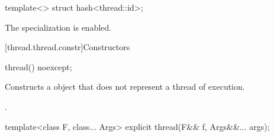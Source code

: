 %
\begin{itemdecl}
template<> struct hash<thread::id>;
\end{itemdecl}

\begin{itemdescr}
\pnum The specialization is enabled.
\end{itemdescr}

[thread.thread.constr]{Constructors}

%
\begin{itemdecl}
thread() noexcept;
\end{itemdecl}

\begin{itemdescr}
\pnum\effects Constructs a  object that does not represent a thread of execution.

\pnum\ensures {}.
\end{itemdescr}

%
\begin{itemdecl}
template<class F, class... Args> explicit thread(F&& f, Args&&... args);
\end{itemdecl}

